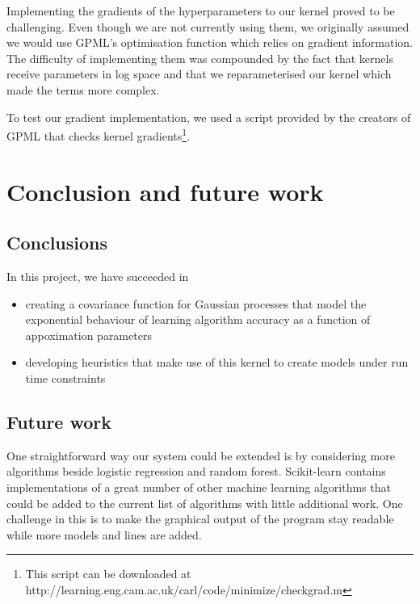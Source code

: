 \documentclass[a4paper,12pt,twoside,openright]{report}
\begin{document}
Implementing the gradients of the hyperparameters to our kernel proved to be challenging. Even though we are not currently using them, we originally assumed we would use GPML's optimisation function which relies on gradient information. The difficulty of implementing them was compounded by the fact that kernels receive parameters in log space and that we reparameterised our kernel which made the terms more complex.

To test our gradient implementation, we used a script provided by the creators of GPML that checks kernel gradients\footnote{This script can be downloaded at http://learning.eng.cam.ac.uk/carl/code/minimize/checkgrad.m}.




\chapter{Conclusion and future work} 
\section{Conclusions}
In this project, we have succeeded in
\begin{itemize}
	\item creating a covariance function for Gaussian processes that model the exponential behaviour of learning algorithm accuracy as a function of appoximation parameters
	\item developing heuristics that make use of this kernel to create models under run time constraints
\end{itemize}


\section{Future work}
One straightforward way our system could be extended is by considering more algorithms beside logistic regression and random forest. Scikit-learn contains implementations of a great number of other machine learning algorithms that could be added to the current list of algorithms with little additional work. One challenge in this is to make the graphical output of the program stay readable while more models and lines are added.
\end{document}
